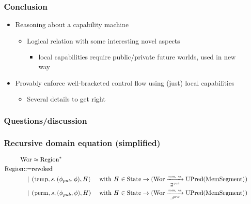 \documentclass{beamer}
\newcommand{\fun}{\rightarrow}
\newcommand{\var}[1]{\mathit{#1}}
\newcommand{\pub}{\var{pub}}
\newcommand{\futurewk}{\mathbin{\sqsupseteq}^{\var{pub}}}
\newcommand{\futurestr}{\mathbin{\sqsupseteq}^{\var{priv}}}
\newcommand{\monwknefun}{\xrightarrow[\text{\tiny{$\futurewk$}}]{\textit{\tiny{mon, ne}}}}
\newcommand{\monstrnefun}{\xrightarrow[\text{\tiny{$\futurestr$}}]{\textit{\tiny{mon, ne}}}}
\newcommand{\plaindom}[1]{\mathrm{#1}}
\newcommand{\HeapSegments}{\plaindom{MemSegment}}
\newcommand{\States}{\plaindom{State}}
\newcommand{\Wor}{\plaindom{Wor}}
\newcommand{\UPred}[1]{\plaindom{UPred}(#1)}
\newcommand{\plainview}[1]{\mathrm{#1}}
\newcommand{\perma}{\plainview{perm}}
\newcommand{\temp}{\plainview{temp}}
\newcommand{\revoked}{\plainview{revoked}}
\begin{document}
\begin{frame}
  \frametitle{Conclusion}

  \begin{itemize}
  \item Reasoning about a capability machine
    \begin{itemize}
    \item Logical relation with some interesting novel aspects
      \begin{itemize}
      \item local capabilities require public/private future worlds, used in new
        way
      \end{itemize}
    \end{itemize}
  \item Provably enforce well-bracketed control flow using (just) local
    capabilities
    \begin{itemize}
    \item Several details to get right
    \end{itemize}
  \end{itemize}
\end{frame}

\begin{frame}
  \frametitle{Questions/discussion}
\end{frame}

\begin{frame}
  \frametitle{Recursive domain equation (simplified)}
    {\tiny
      \begin{align*}
        \Wor &\approx \mathrm{Region}^*\\
        \mathrm{Region} \mathbin{::=}&\revoked\\
        \mid\ &(\temp, s, (\phi_\pub,\phi), H ) &\text{ with } H \in \States \fun (\Wor \monwknefun \UPred{\HeapSegments}) \\
        \mid\ &(\perma, s, (\phi_\pub,\phi), H) &\text{ with }  H \in \States \fun (\Wor \monstrnefun \UPred{\HeapSegments})
      \end{align*}}
\end{frame}



% 
\end{document}
